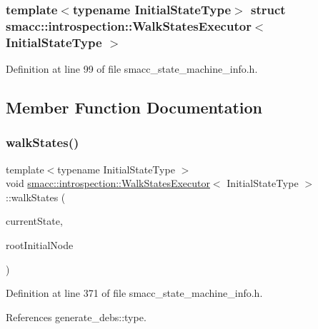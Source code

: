 \subsubsection*{template$<$typename Initial\+State\+Type$>$\newline
struct smacc\+::introspection\+::\+Walk\+States\+Executor$<$ Initial\+State\+Type $>$}



Definition at line 99 of file smacc\+\_\+state\+\_\+machine\+\_\+info.\+h.



\subsection{Member Function Documentation}
\mbox{\label{structsmacc_1_1introspection_1_1WalkStatesExecutor_a21848ccc6e7a7ddee0ccfff97e550ec6}} 
\subsubsection{\texorpdfstring{walk\+States()}{walkStates()}}
{\footnotesize\ttfamily template$<$typename Initial\+State\+Type $>$ \\
void \hyperlink{structsmacc_1_1introspection_1_1WalkStatesExecutor}{smacc\+::introspection\+::\+Walk\+States\+Executor}$<$ Initial\+State\+Type $>$\+::walk\+States (\begin{DoxyParamCaption}\item[{std\+::shared\+\_\+ptr$<$ \hyperlink{classsmacc_1_1introspection_1_1SmaccStateInfo}{Smacc\+State\+Info} $>$ \&}]{current\+State,  }\item[{\hyperlink{classbool}{bool}}]{root\+Initial\+Node }\end{DoxyParamCaption})\hspace{0.3cm}{\ttfamily [static]}}



Definition at line 371 of file smacc\+\_\+state\+\_\+machine\+\_\+info.\+h.



References generate\+\_\+debs\+::type.




